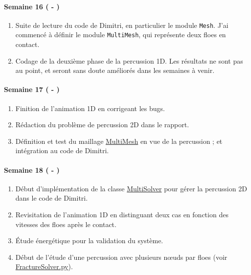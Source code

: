 \paragraph{Semaine 16 ( - )} 
\begin{enumerate}
    \item Suite de lecture du code de Dimitri, en particulier le module \texttt{Mesh}. J'ai commencé à définir le module \texttt{MultiMesh}, qui représente deux floes en contact. 
    \item Codage de la deuxième phase de la percussion 1D. Les résultats ne sont pas au point, et seront sans doute améliorés dans les semaines à venir.
\end{enumerate}
  

\paragraph{Semaine 17 ( - )} 
\begin{enumerate}
    \item Finition de l'animation 1D en corrigeant les bugs.
    \item Rédaction du problème de percussion 2D dans le rapport.
    \item Définition et test du maillage \href{https://framagit.org/RaK/SimuRessorts/-/blob/master/springslattice/multimesh.py}{MultiMesh} en vue de la percussion ; et intégration au code de Dimitri.
\end{enumerate}
  

\paragraph{Semaine 18 ( - )} 
\begin{enumerate}
    \item Début d'implémentation de la classe \href{https://framagit.org/RaK/SimuRessorts/-/blob/master/springslattice/multisolver.py}{MultiSolver} pour gérer la percussion 2D dans le code de Dimitri.
    \item Revisitation de l'animation 1D en distinguant deux cas en fonction des vitesses des floes après le contact.
    \item Étude énergétique pour la validation du système.
    \item Début de l'étude d'une percussion avec plusieurs n\oe{}uds par floes (voir \href{https://github.com/desmond-rn/ice-floes/blob/master/code/simu1D/FractureSolver.py}{FractureSolver.py}).
\end{enumerate}
  

